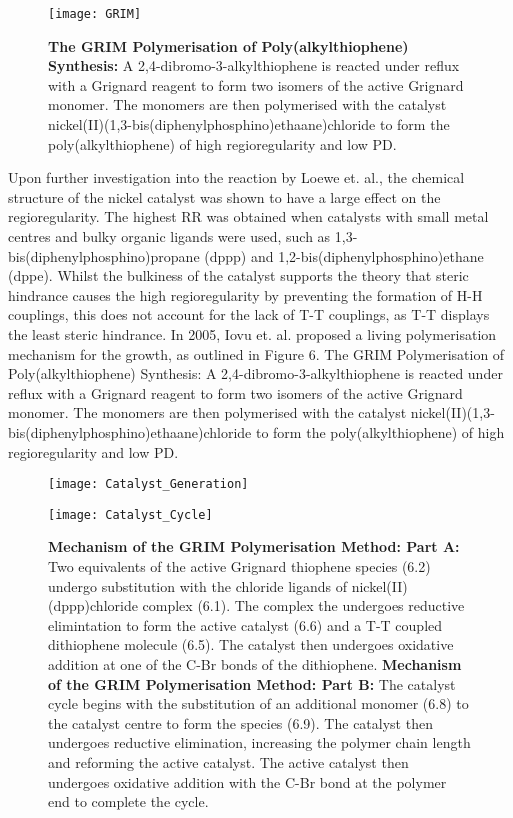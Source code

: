 \begin{figure}[h]
\centering
\texttt{[image: GRIM]}
\caption{\textbf{The GRIM Polymerisation of Poly(alkylthiophene) Synthesis:} A 2,4-dibromo-3-alkylthiophene is reacted under reflux with a Grignard reagent to form two isomers of the active Grignard monomer. The monomers are then polymerised with the catalyst nickel(II)(1,3-bis(diphenylphosphino)ethaane)chloride to form the poly(alkylthiophene) of high regioregularity and low PD.}
\centering
\end{figure}

Upon further investigation into the reaction by Loewe et. al., the chemical structure of the nickel catalyst was shown to have a large effect on the regioregularity. The highest RR was obtained when catalysts with small metal centres and bulky organic ligands were used, such as 1,3-bis(diphenylphosphino)propane (dppp) and 1,2-bis(diphenylphosphino)ethane (dppe). Whilst the bulkiness of the catalyst supports the theory that steric hindrance causes the high regioregularity by preventing the formation of H-H couplings, this does not account for the lack of T-T couplings, as T-T displays the least steric hindrance. In 2005, Iovu et. al. proposed a living polymerisation mechanism for the growth, as outlined in Figure 6.
The GRIM Polymerisation of Poly(alkylthiophene) Synthesis: A 2,4-dibromo-3-alkylthiophene is reacted under reflux with a Grignard reagent to form two isomers of the active Grignard monomer. The monomers are then polymerised with the catalyst nickel(II)(1,3-bis(diphenylphosphino)ethaane)chloride to form the poly(alkylthiophene) of high regioregularity and low PD.

\begin{figure}[h]
\centering
\texttt{[image: Catalyst\_Generation]}
\caption{\textbf{Mechanism of the GRIM Polymerisation Method: Part A:} Two equivalents of the active Grignard thiophene species (6.2) undergo substitution with the chloride ligands of nickel(II)(dppp)chloride complex (6.1). The complex the undergoes reductive elimintation to form the active catalyst (6.6) and a T-T coupled dithiophene molecule (6.5). The catalyst then undergoes oxidative addition at one of the C-Br bonds of the dithiophene. \textbf{Mechanism of the GRIM Polymerisation Method: Part B:} The catalyst cycle begins with the substitution of an additional monomer (6.8) to the catalyst centre to form the species (6.9). The catalyst then undergoes reductive elimination, increasing the polymer chain length and reforming the active catalyst. The active catalyst then undergoes oxidative addition with the C-Br bond at the polymer end to complete the cycle.}
\centering
\texttt{[image: Catalyst\_Cycle]}
\centering
\end{figure}

